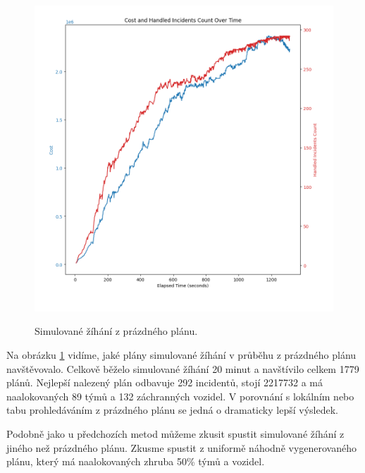 \begin{figure}[H]
  \caption{Simulované žíhání z prázdného plánu.}
  \includegraphics[width=\textwidth]{img/sa_empty_elapsed.png}
  \centering
  \label{img:sa_empty}
\end{figure}

Na obrázku \ref{img:sa_empty} vidíme, jaké plány simulované žíhání v průběhu z prázdného plánu navštěvovalo.
Celkově běželo simulované žíhání 20 minut a navštívilo celkem 1779 plánů.
Nejlepší nalezený plán odbavuje 292 incidentů, stojí 2217732 a má naalokovaných 89 týmů a 132 záchranných vozidel.
V porovnání s lokálním nebo tabu prohledáváním z prázdného plánu se jedná o dramaticky lepší výsledek.

Podobně jako u předchozích metod můžeme zkusit spustit simulované žíhání z jiného než prázdného plánu.
Zkusme spustit z uniformě náhodně vygenerovaného plánu, který má naalokovaných zhruba 50\% týmů a vozidel.

